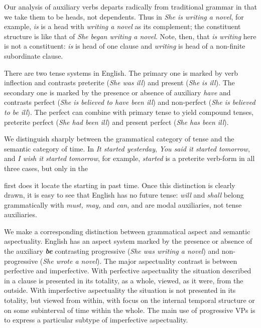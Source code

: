 Our analysis of auxiliary verbs departs radically from traditional grammar in that we take them to be heads, not dependents. Thus in \textit{She is writing a novel}, for example, \textit{is} is a head with \textit{writing a novel} as its complement; the constituent structure is like that of \textit{She began writing a novel}. Note, then, that \textit{is writing} here is not a constituent: \textit{is} is head of one clause and \textit{writing} is head of a non-finite subordinate clause.

There are two tense systems in English. The primary one is marked by verb inflection and contrasts {preterite} (\textit{She was ill}) and {present} (\textit{She is ill}). The secondary one is marked by the presence or absence of auxiliary \textit{have} and contrasts {perfect} (\textit{She is believed to have been ill}) and {non-perfect} (\textit{She is believed to be ill}). The perfect can combine with primary tense to yield compound tenses, {preterite perfect} (\textit{She had been ill}) and {present perfect} (\textit{She has been ill}).

{
We distinguish sharply between the grammatical category of {tense} and the semantic category of {time}. In \textit{It started yesterday}, \textit{You said it started tomorrow}, and \textit{I wish it started tomorrow}}, for example, \textit{started} is a preterite verb-form in all three cases, but only in the

\newpage

\noindent first does it locate the starting in past time. Once this distinction is clearly drawn, it is easy to see that English has no future tense: \textit{will} and \textit{shall} belong grammatically with \textit{must, may,} and \textit{can}, and are modal auxiliaries, not tense auxiliaries.

We make a corresponding distinction between grammatical {aspect} and semantic {aspectuality}. English has an aspect system marked by the presence or absence of the auxiliary \textit{\textbf{be}} contrasting {progressive} (\textit{She was writing a novel}) and {non-progressive} (\textit{She wrote a novel}). The major aspectuality contrast is between {perfective} and {imperfective}. With perfective aspectuality the situation described in a clause is presented in its totality, as a whole, viewed, as it were, from the outside. With imperfective aspectuality the situation is not presented in its totality, but viewed from within, with focus on the internal temporal structure or on some subinterval of time within the whole. The main use of progressive VPs is to express a particular subtype of imperfective aspectuality.

